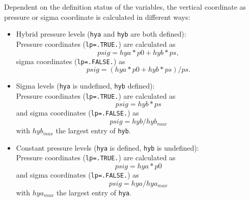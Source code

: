\documentclass[11pt,twoside]{article}
\begin{document}
Dependent on the definition status of the variables, the vertical
coordinate as pressure or sigma coordinate is calculated 
in different ways:
\begin{itemize}
\item Hybrid pressure levels (\verb|hya| and \verb|hyb| are both defined):\\
Pressure coordinates (\verb|lp=.TRUE.|) are calculated as 
\begin{equation}
psig = hya * p0 + hyb * ps ,      
\end{equation}
sigma coordinates (\verb|lp=.FALSE.|) as
\begin{equation}
psig = (hya * p0 + hyb * ps) / ps  .
\end{equation}
\item Sigma levels (\verb|hya| is undefined, \verb|hyb| defined):\\
Pressure coordinates (\verb|lp=.TRUE.|) are calculated as
\begin{equation}
psig = hyb * ps      
\end{equation}
and sigma coordinates (\verb|lp=.FALSE.|) as 
\begin{equation}
psig = hyb / hyb_{max}
\end{equation}
 with $hyb_{max}$ the largest entry of \verb|hyb|.
\item Constant pressure levels (\verb|hya| is defined, \verb|hyb| is
undefined):\\
Pressure coordinates (\verb|lp=.TRUE.|) are calculated as
\begin{equation}
psig = hya * p0      
\end{equation}
and sigma coordinates (\verb|lp=.FALSE.|) as
\begin{equation}
psig = hya / hya_{max}
\end{equation}
 with $hya_{max}$ the largest entry of \verb|hya|.
\end{itemize}

\end{document}
